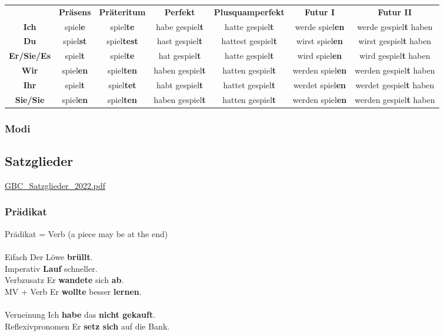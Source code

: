 \begin{center}
\begin{tabular}{|c|c|c|c|c|c|c|}
    \textbf{} & \textbf{Präsens} & \textbf{Präteritum} & \textbf{Perfekt} & \textbf{Plusquamperfekt} & \textbf{Futur I} & \textbf{Futur II} \\
    \textbf{Ich} & spiel\textbf{e} & spiel\textbf{te} & habe gespiel\textbf{t} & hatte gespiel\textbf{t} & werde spiel\textbf{en} & werde gespiel\textbf{t} haben \\
    \textbf{Du} & spiel\textbf{st} & spiel\textbf{test} & hast gespiel\textbf{t} & hattest gespiel\textbf{t} & wirst spiel\textbf{en} & wirst gespiel\textbf{t} haben \\
    \textbf{Er/Sie/Es} & spiel\textbf{t} & spiel\textbf{te} & hat gespiel\textbf{t} & hatte gespiel\textbf{t} & wird spiel\textbf{en} & wird gespiel\textbf{t} haben \\
    \textbf{Wir} & spiel\textbf{en} & spiel\textbf{ten} & haben gespiel\textbf{t} & hatten gespiel\textbf{t} & werden spiel\textbf{en} & werden gespiel\textbf{t} haben \\
    \textbf{Ihr} & spiel\textbf{t} & spiel\textbf{tet} & habt gespiel\textbf{t} & hattet gespiel\textbf{t} & werdet spiel\textbf{en} & werdet gespiel\textbf{t} haben \\
    \textbf{Sie/Sie} & spiel\textbf{en} & spiel\textbf{ten} & haben gespiel\textbf{t} & hatten gespiel\textbf{t} & werden spiel\textbf{en} & werden gespiel\textbf{t} haben \\
\end{tabular}
\end{center}

\subsubsection{Modi}

\subsection{Satzglieder}

\href{run:./includes/german/GBC/GBC_Satzglieder_2022.pdf}{GBC\_Satzglieder\_2022.pdf}

\subsubsection{Prädikat}

Prädikat = Verb (a piece may be at the end)\\
\\
Eifach \arrow Der Löwe \textbf{brüllt}.\\
Imperativ \arrow \textbf{Lauf} schneller.\\
Verbzusatz \arrow Er \textbf{wandete} sich \textbf{ab}.\\
MV + Verb \arrow Er \textbf{wollte} besser \textbf{lernen}.\\
\\
Verneinung \arrow Ich \textbf{habe} das \textbf{nicht gekauft}.\\
Reflexivpronomen \arrow Er \textbf{setz sich} auf die Bank.\\

